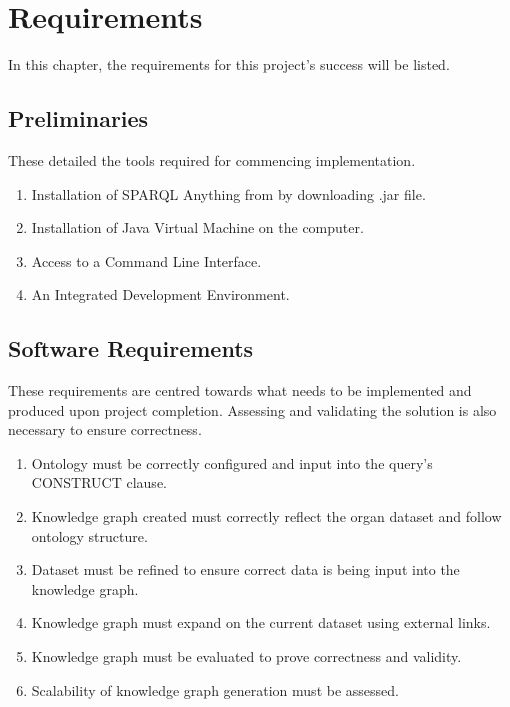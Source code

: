 \chapter{Requirements}
In this chapter, the requirements for this project's success will be listed.

\section{Preliminaries}
\hspace{0.5cm} These detailed the tools required for commencing implementation.
\begin{enumerate}
    \itemsep0em 
\item Installation of SPARQL Anything from \cite{sparqlanythinggithub} by downloading .jar file.
\item Installation of Java Virtual Machine on the computer. 
\item Access to a Command Line Interface.
\item An Integrated Development Environment.
\end{enumerate}

\section{Software Requirements}
\hspace{0.5cm} These requirements are centred towards what needs to be implemented and produced upon project completion. Assessing and validating the solution is also necessary to ensure correctness.
\begin{enumerate}
    \itemsep0em 
\item Ontology must be correctly configured and input into the query's CONSTRUCT clause.
\item Knowledge graph created must correctly reflect the organ dataset and follow ontology structure.
\item Dataset must be refined to ensure correct data is being input into the knowledge graph.
\item Knowledge graph must expand on the current dataset using external links.
\item Knowledge graph must be evaluated to prove correctness and validity.
\item Scalability of knowledge graph generation must be assessed.
\end{enumerate}


